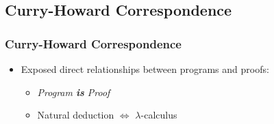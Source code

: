 \subsection{Curry-Howard Correspondence}

\begin{frame}
  \frametitle{Curry-Howard Correspondence}
  \begin{itemize}
    \item Exposed direct relationships between programs and proofs:
      \begin{itemize}
        \item \emph{Program {\bf is} Proof}
        \item Natural deduction $\Leftrightarrow$ $\lambda$-calculus
      \end{itemize}
  \end{itemize}
\end{frame}
